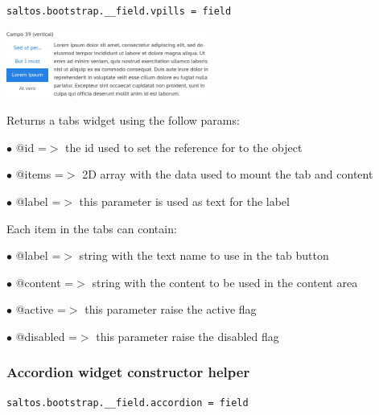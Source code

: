 \documentclass[a4paper]{article}
\begin{document}
\begin{lstlisting}
saltos.bootstrap.__field.vpills = field
\end{lstlisting}

\begin{center}\includegraphics[width=0.5\textwidth]{../ujest/snaps/test-bootstrap-js-bootstrap-campo-39-vertical-1-snap.png}\end{center}

Returns a tabs widget using the follow params:

\begin{compactitem}
\item[\color{myblue}$\bullet$] @id    =$>$ the id used to set the reference for to the object
\item[\color{myblue}$\bullet$] @items =$>$ 2D array with the data used to mount the tab and content
\item[\color{myblue}$\bullet$] @label    =$>$ this parameter is used as text for the label
\end{compactitem}

Each item in the tabs can contain:

\begin{compactitem}
\item[\color{myblue}$\bullet$] @label    =$>$ string with the text name to use in the tab button
\item[\color{myblue}$\bullet$] @content  =$>$ string with the content to be used in the content area
\item[\color{myblue}$\bullet$] @active   =$>$ this parameter raise the active flag
\item[\color{myblue}$\bullet$] @disabled =$>$ this parameter raise the disabled flag
\end{compactitem}

\hypertarget{toc90}{}
\subsubsection{Accordion widget constructor helper}

\begin{lstlisting}
saltos.bootstrap.__field.accordion = field
\end{lstlisting}
\end{document}
